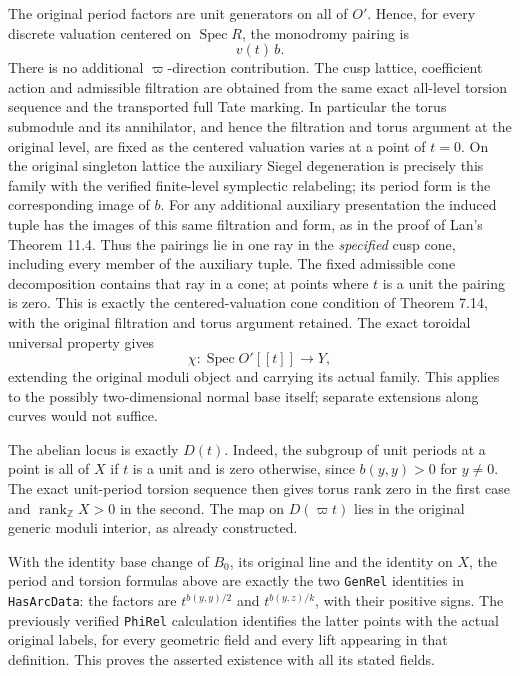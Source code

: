 The original period factors are unit generators on all of $O'$.
Hence, for every discrete valuation centered on
$\operatorname{Spec}R$, the monodromy pairing is
\[
                           v(t)\,b.
\]
There is no additional $\varpi$-direction contribution.
The cusp lattice, coefficient action and admissible filtration
are obtained from the same exact all-level torsion sequence and
the transported full Tate marking.  In particular the torus
submodule and its annihilator, and hence the filtration and
torus argument at the original level, are fixed as the centered
valuation varies at a point of $t=0$.  On the original singleton
lattice the auxiliary Siegel degeneration is precisely this
family with the verified finite-level symplectic relabeling;
its period form is the corresponding image of $b$.
For any additional auxiliary presentation the induced tuple
has the images of this same filtration and form, as in the
proof of Lan's Theorem 11.4.  Thus the pairings lie in one ray
in the \emph{specified} cusp cone, including every member of
the auxiliary tuple.  The fixed admissible cone decomposition
contains that ray in a cone; at points where $t$ is a unit the
pairing is zero.  This is exactly the centered-valuation cone
condition of Theorem 7.14, with the original filtration and
torus argument retained.  The exact toroidal universal property gives
\[
              \chi:\operatorname{Spec}O'[[t]]\longrightarrow Y,
\]
extending the original moduli object and carrying its actual
family\cite[Theorem 11.4]{formal-arcs-ramified}.
This applies to the possibly two-dimensional normal base itself;
separate extensions along curves would not suffice.

The abelian locus is exactly $D(t)$.  Indeed, the subgroup of
unit periods at a point is all of $X$ if $t$ is a unit and is
zero otherwise, since $b(y,y)>0$ for $y\ne0$.  The exact
unit-period torsion sequence then gives torus rank zero in the
first case and $\operatorname{rank}_{\mathbb Z}X>0$ in the
second\cite[Proposition 4.5.3.11 and Corollary 4.5.3.12]
{formal-arcs-lan}.  The map on $D(\varpi t)$ lies in the
original generic moduli interior, as already constructed.

With the identity base change of $B_0$, its original line and
the identity on $X$, the period and torsion formulas above are
exactly the two \texttt{GenRel} identities in
\texttt{HasArcData}: the factors are
$t^{b(y,y)/2}$ and $t^{b(y,z)/k}$, with their positive signs.
The previously verified \texttt{PhiRel} calculation identifies
the latter points with the actual original labels, for every
geometric field and every lift appearing in that definition.
This proves the asserted existence with all its stated fields.

